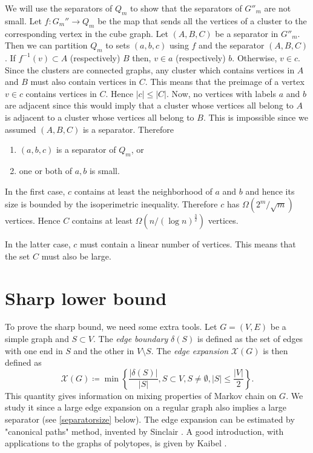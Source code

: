 \documentclass[a4paper,12pt]{book}
\theoremstyle{plain}
\theoremstyle{definition}
\begin{document}

We will use the separators of $Q_m$ to show that the separators of $G''_m$ are not small.
Let $f: G_m'' \rightarrow Q_m$ 
be the map that sends all the vertices of a cluster to the corresponding vertex 
in the cube graph. 
Let $(A,B,C)$ be a separator in $G''_m$. Then we can partition
$Q_m$ to sets $(a,b,c)$ using $f$ and the separator $(A,B,C)$. If $f^{-1}(v) \subset A$ (respectively) $B$ 
then, $v \in a$ (respectively) $b$. Otherwise, $v \in c$. Since the clusters are connected 
graphs, any cluster which contains vertices in $A$ and $B$ must also contain 
vertices in $C$. This means that the preimage of a vertex $v \in c$ contains vertices in $C$. Hence $|c| \leq |C|$. 
Now, no vertices with labels $a$ and $b$ are adjacent since this would imply 
that a cluster whose vertices all belong to $A$ is adjacent to a cluster whose vertices all belong to 
$B$. This is impossible since we assumed $(A,B,C)$ is a separator. Therefore
\begin{enumerate}
 \item $(a,b,c)$ is a separator of $Q_m$, or
\item one or both of $a,b$ is small.
\end{enumerate}
In the first case, $c$ contains at least the neighborhood of $a$ and $b$ and 
hence its size is bounded by the isoperimetric inequality. Therefore $c$ has 
$\Omega(2^m/\sqrt{m})$ vertices. Hence $C$ contains at least $\Omega(n/(\log 
n)^{\frac{3}{2}})$ vertices.

In the latter case, $c$ must contain a linear number of vertices. This means 
that the set $C$ must also be large.  

\section{Sharp lower bound}

To prove the sharp bound, we need some extra tools. Let $G= (V,E)$ be a simple graph and
 $S\subset V$. The \textit{edge boundary} $\delta(S)$ is defined as the set of edges with one end
in $S$ and the other in $V\setminus S$. The \textit{edge expansion} $\mathcal{X}(G)$ is then defined
as 
\begin{equation}
\mathcal{X}(G) \coloneqq  \min \left\{ \frac{ |\delta(S) |}{ |S |}, S \subset V, S\neq \emptyset, |S| \leq \frac{ |V |}{2}  \right\}.
\end{equation} 
This quantity gives information on mixing properties of Markov chain on $G$. We study it since
a large edge expansion on a regular graph also implies a large separator (see \ref{separatorsize} below).
The edge expansion can be estimated by "canonical paths" method, invented by Sinclair \cite{Sinclair}. 
A good introduction, with applications to the graphs of polytopes, is given by Kaibel \cite{Kaibel}. 
\end{document}
